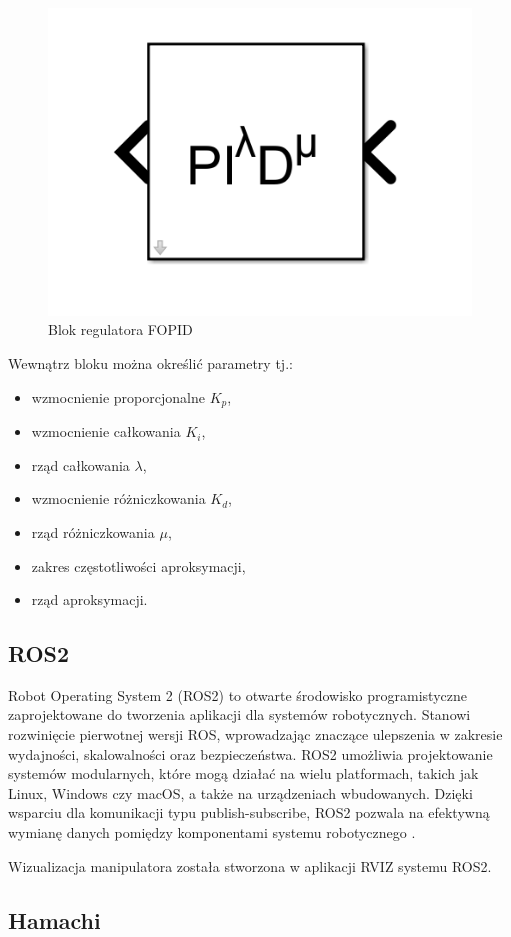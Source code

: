 \documentclass[journal,twoside,web]{ieeecolor}
\begin{document}
\begin{figure}[H]
	\centering
	\includegraphics[width=0.7\linewidth]{../figs/FOPID}
	\caption{Blok regulatora FOPID}
	\label{fig:fopid}
\end{figure}

Wewnątrz bloku można określić parametry tj.:

\begin{itemize}
	\item wzmocnienie proporcjonalne $K_{p}$,
	\item wzmocnienie całkowania $K_{i}$,
	\item rząd całkowania $\lambda$,
	\item wzmocnienie różniczkowania $K_{d}$,
	\item rząd różniczkowania $\mu$,
	\item zakres częstotliwości aproksymacji,
	\item rząd aproksymacji. 
\end{itemize}
\subsection{ROS2}
Robot Operating System 2 (ROS2) to otwarte środowisko programistyczne zaprojektowane do tworzenia aplikacji dla systemów robotycznych. Stanowi rozwinięcie pierwotnej wersji ROS, wprowadzając znaczące ulepszenia w zakresie wydajności, skalowalności oraz bezpieczeństwa. ROS2 umożliwia projektowanie systemów modularnych, które mogą działać na wielu platformach, takich jak Linux, Windows czy macOS, a także na urządzeniach wbudowanych. Dzięki wsparciu dla komunikacji typu publish-subscribe, ROS2 pozwala na efektywną wymianę danych pomiędzy komponentami systemu robotycznego \href{https://docs.ros.org/en/foxy/index.html}{\cite{ROS2}}. 

Wizualizacja manipulatora została stworzona w aplikacji RVIZ systemu ROS2. 
\subsection{Hamachi}
\end{document}
